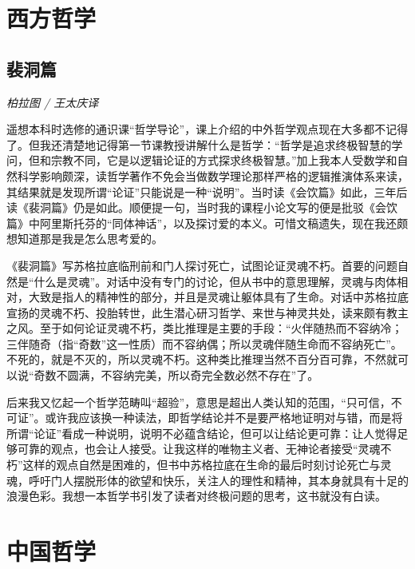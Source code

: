 \section{西方哲学}

\subsection*{裴洞篇}
\par \emph{柏拉图 / 王太庆译} 
\par 遥想本科时选修的通识课“哲学导论”，课上介绍的中外哲学观点现在大多都不记得了。但我还清楚地记得第一节课教授讲解什么是哲学：“哲学是追求终极智慧的学问，但和宗教不同，它是以逻辑论证的方式探求终极智慧。”加上我本人受数学和自然科学影响颇深，读哲学著作不免会当做数学理论那样严格的逻辑推演体系来读，其结果就是发现所谓“论证”只能说是一种“说明”。当时读《会饮篇》如此，三年后读《裴洞篇》仍是如此。顺便提一句，当时我的课程小论文写的便是批驳《会饮篇》中阿里斯托芬的“同体神话”，以及探讨爱的本义。可惜文稿遗失，现在我还颇想知道那是我是怎么思考爱的。
\par 《裴洞篇》写苏格拉底临刑前和门人探讨死亡，试图论证灵魂不朽。首要的问题自然是“什么是灵魂”。对话中没有专门的讨论，但从书中的意思理解，灵魂与肉体相对，大致是指人的精神性的部分，并且是灵魂让躯体具有了生命。对话中苏格拉底宣扬的灵魂不朽、投胎转世，此生潜心研习哲学、来世与神灵共处，读来颇有教主之风。至于如何论证灵魂不朽，类比推理是主要的手段：“火伴随热而不容纳冷；三伴随奇（指“奇数”这一性质）而不容纳偶；所以灵魂伴随生命而不容纳死亡”。不死的，就是不灭的，所以灵魂不朽。这种类比推理当然不百分百可靠，不然就可以说“奇数不圆满，不容纳完美，所以奇完全数必然不存在”了。
\par 后来我又忆起一个哲学范畴叫“超验”，意思是超出人类认知的范围，“只可信，不可证”。或许我应该换一种读法，即哲学结论并不是要严格地证明对与错，而是将所谓“论证”看成一种说明，说明不必蕴含结论，但可以让结论更可靠：让人觉得足够可靠的观点，也会让人接受。让我这样的唯物主义者、无神论者接受“灵魂不朽”这样的观点自然是困难的，但书中苏格拉底在生命的最后时刻讨论死亡与灵魂，呼吁门人摆脱形体的欲望和快乐，关注人的理性和精神，其本身就具有十足的浪漫色彩。我想一本哲学书引发了读者对终极问题的思考，这书就没有白读。
\par {}

\section{中国哲学}

